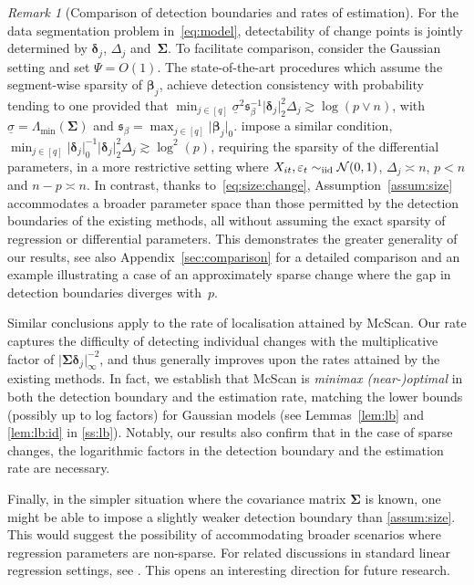 \documentclass[11pt, a4paper]{article}
\newcommand{\mc}{\mathcal}
\newcommand{\vep}{\varepsilon}
\newcommand{\iid}{\text{\upshape iid}}
\theoremstyle{definition}
\theoremstyle{definition}
\theoremstyle{definition}
\theoremstyle{definition}
\theoremstyle{definition}
\theoremstyle{remark}
\newtheorem{rem}{Remark}[section]
\theoremstyle{definition}
\theoremstyle{definition}
\theoremstyle{definition}
\begin{document}
\begin{rem}[Comparison of detection boundaries and rates of estimation]
\label{rem:dlb}
For the data segmentation problem in~\eqref{eq:model}, detectability of change points is jointly determined by $\bm\delta_j$, $\Delta_j$ and~$\bm\Sigma$.
To facilitate comparison, consider the Gaussian setting and set $\Psi = O(1)$.
The state-of-the-art procedures which assume the segment-wise sparsity of $\bm\beta_j$, achieve detection consistency with probability tending to one provided that 
$\min_{j \in [q]} \underline{\sigma}^2 \mathfrak{s}_\beta^{-1} \vert \bm\delta_j \vert_2^2 \Delta_j \gtrsim \log(p \vee n)$,
with $\underline{\sigma} = \Lambda_{\min}(\bm\Sigma)$ and $\mathfrak{s}_\beta = \max_{j \in [q]} \vert \bm\beta_j \vert_0$. \cite{gao2022sparse} impose a similar condition, $\min_{j \in [q]} \vert \bm\delta_j \vert_0^{-1} \vert \bm\delta_j \vert_2^2 \Delta_j \gtrsim \log^2(p)$, requiring the sparsity of the differential parameters, in a more restrictive setting where $X_{it}, \vep_t \sim_{\iid} \mc N(0, 1)$, $\Delta_j \asymp n$, $p < n$ and $n - p \asymp n$. In contrast, thanks to~\eqref{eq:size:change}, 
Assumption~\ref{assum:size} accommodates a broader parameter space than those permitted by the detection boundaries of the existing methods, all without assuming the exact sparsity of regression or differential parameters. This demonstrates the greater generality of our results, see also Appendix~\ref{sec:comparison} for a detailed comparison and an example illustrating a case of an approximately sparse change where the gap in detection boundaries diverges with~$p$.

Similar conclusions apply to the rate of localisation attained by McScan. Our rate captures the difficulty of detecting individual changes with the multiplicative factor of $\vert \bm\Sigma \bm\delta_j \vert_\infty^{-2}$, and thus generally improves upon the rates attained by the existing methods. In fact, we establish that McScan is \emph{minimax (near-)optimal} in both the detection boundary and the estimation rate, matching the lower bounds (possibly up to log factors) for Gaussian models (see Lemmas~\ref{lem:lb} and \ref{lem:lb:id} in \cref{ss:lb}). Notably, our results also confirm that in the case of sparse changes, the logarithmic factors in the detection boundary and the estimation rate are necessary. 


Finally, in the simpler situation where the covariance matrix $\bm\Sigma$ is known, one might be able to impose a slightly weaker detection boundary than \cref{assum:size}. This would suggest the possibility of accommodating broader scenarios where regression parameters are non-sparse. For related discussions in standard linear regression settings, see \citet{verzelen2018adaptive}. This opens an interesting direction for future research.  
\end{rem}
\end{document}
